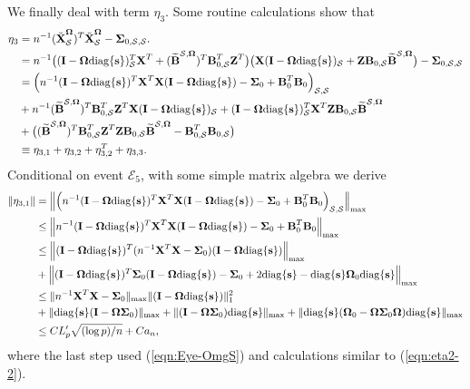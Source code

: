 \documentclass[11pt]{article}
\newcommand{\bs}{\mbox{\bf s}}
\newcommand{\bB}{\mbox{\bf B}}
\newcommand{\bI}{\mbox{\bf I}}
\newcommand{\bX}{\mbox{\bf X}}
\newcommand{\bZ}{\mbox{\bf Z}}
\newcommand{\bSig}{\mbox{\boldmath $\Sigma$}}
\newcommand{\bOmg}{\mbox{\boldmath $\Omega$}}
\newcommand{\sbOmg}{\mbox{\scriptsize\boldmath $\Omega$}}
\newcommand{\Sig}{\mathbf{\Sigma}}
\newcommand{\diag}{\mathrm{diag}}
\begin{document}
We finally deal with term $\eta_{3}$. Some routine calculations show that
\begin{align*}
\eta_{3}
& =
n^{-1} (\breve{\bX}_{\mathcal S}^{\sbOmg})^{T} \breve{\bX}_{\mathcal S}^{\sbOmg} - \bSig_{0, \mathcal{S}, \mathcal{S}}.
\\
& =
n^{-1}
\big( ( \bI- \bOmg\diag\{\bs\})_{\mathcal S}^{T} \bX^{T}  + ( \widetilde{\bB}^{\mathcal{S}, \sbOmg} )^{T} \bB_{0,\mathcal{S}}^{T} \bZ^{T}
\big) \big( \bX( \bI- \bOmg\diag\{\bs\})_{\mathcal S} + \bZ\bB_{0,\mathcal{S}}\widetilde{\bB}^{\mathcal{S}, \sbOmg}
\big)
- \bSig_{0, \mathcal{S}, \mathcal{S}}
\\
& =
\Big( n^{-1}
(\bI- \bOmg\diag\{\bs\})^{T} \bX^{T}
\bX( \bI- \bOmg\diag\{\bs\})
- \bSig_{0} + \bB_{0}^T \bB_{0}  \Big)_{\mathcal{S}, \mathcal{S}}
\\
& + n^{-1}
( \widetilde{\bB}^{\mathcal{S}, \sbOmg} )^{T} \bB_{0,\mathcal{S}}^{T} \bZ^{T}
\bX( \bI- \bOmg\diag\{\bs\})_{\mathcal S}
+
( \bI- \bOmg\diag\{\bs\})_{\mathcal S}^{T} \bX^{T}
\bZ\bB_{0,\mathcal{S}}\widetilde{\bB}^{\mathcal{S}, \sbOmg}
\\ & +
\big( ( \widetilde{\bB}^{\mathcal{S}, \sbOmg} )^{T} \bB_{0,\mathcal{S}}^{T} \bZ^{T}
\bZ\bB_{0,\mathcal{S}}\widetilde{\bB}^{\mathcal{S}, \sbOmg} - \bB_{0,\mathcal{S}}^T \bB_{0,\mathcal{S}} \big)
\\
& \equiv \eta_{3,1} + \eta_{3,2} + \eta_{3,2}^{T} + \eta_{3,3}.
\end{align*}
Conditional on event $\mathcal{E}_{5}$, with some simple matrix algebra we derive
\begin{align}
\| \eta_{3,1}\| & = \Big\| \Big( n^{-1}
(\bI- \bOmg\diag\{\bs\})^{T} \bX^{T}
\bX( \bI- \bOmg\diag\{\bs\})
- \bSig_{0} + \bB_{0}^T \bB_{0}  \Big)_{\mathcal{S}, \mathcal{S}} \Big\|_{\max}
\nonumber \\
& \le
\Big\| n^{-1}
(\bI- \bOmg\diag\{\bs\})^{T} \bX^{T}
\bX( \bI- \bOmg\diag\{\bs\})
- \bSig_{0} + \bB_{0}^T \bB_{0} \Big\|_{\max}
\nonumber \\
& \le
\Big\|
(\bI- \bOmg\diag\{\bs\})^{T} (n^{-1}\bX^{T}
\bX - \bSig_{0}) (\bI- \bOmg\diag\{\bs\})
\Big\|_{\max}
\nonumber \\ & +
\Big\|
(\bI- \bOmg\diag\{\bs\})^{T} \bSig_{0} (\bI- \bOmg\diag\{\bs\})
- \bSig_{0}
+ 2 \diag\{\bs\}
- \diag\{\bs\}\bOmg_{0}\diag\{\bs\}
\Big\|_{\max}
\nonumber \\
& \le
\|
n^{-1}\bX^{T} \bX - \bSig_{0} \|_{\max}
\| (\bI- \bOmg\diag\{\bs\}) \|^{2}_{1}
\nonumber \\ & +
\| \diag\{\bs\} (\bI- \bOmg \Sig_0) \|_{\max}
+\| (\bI- \bOmg \Sig_0) \diag\{\bs\} \|_{\max}
+\| \diag\{\bs\} (\bOmg_0 - \bOmg \Sig_0 \bOmg) \diag\{\bs\} \|_{\max}
\nonumber \\
& \leq
C L_{p}' \sqrt{(\log p)/n} + C a_{n}, \label{eqn:eta3-1}
\end{align}
where the last step used (\ref{eqn:Eye-OmgS}) and calculations similar to (\ref{eqn:eta2-2}).
\end{document}
